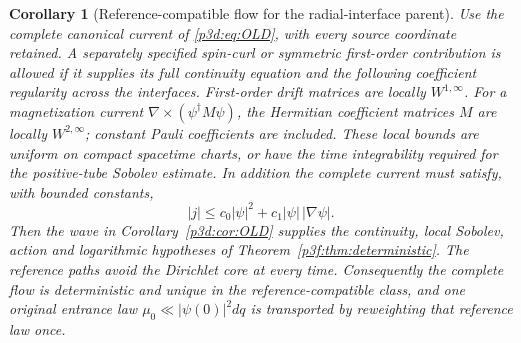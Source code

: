 \documentclass[11pt]{article}
\numberwithin{equation}{section}
\newtheorem{corollary}[theorem]{Corollary}
\theoremstyle{definition}
\theoremstyle{remark}
\begin{document}
\begin{corollary}[Reference-compatible flow for the radial-interface parent]
\label{p3d:cor:OLDflow}
Use the complete canonical current of \eqref{p3d:eq:OLD}, with every
source coordinate retained. A separately specified spin-curl or symmetric first-order contribution
is allowed if it supplies its full continuity equation and the following
coefficient regularity across the interfaces. First-order drift matrices
are locally $W^{1,\infty}$. For a magnetization current
$\nabla\times(\psi^\dagger M\psi)$, the Hermitian coefficient matrices
$M$ are locally $W^{2,\infty}$; constant Pauli coefficients are included.
These local bounds are uniform on compact spacetime charts, or have the
time integrability required for the positive-tube Sobolev estimate.
In addition the complete current must satisfy, with bounded constants,
\begin{equation}\label{p3d:eq:envelope}
 |j|\leq c_0|\psi|^2+c_1|\psi|\,|\nabla\psi|.
\end{equation}
Then the wave in Corollary~\ref{p3d:cor:OLD} supplies the continuity,
local Sobolev, action and logarithmic hypotheses of
Theorem~\ref{p3f:thm:deterministic}. The reference paths avoid the
Dirichlet core at every time. Consequently the complete flow is
deterministic and unique in the reference-compatible class, and one
original entrance law $\mu_0\ll|\psi(0)|^2dq$ is transported by
reweighting that reference law once.
\end{corollary}
\end{document}
